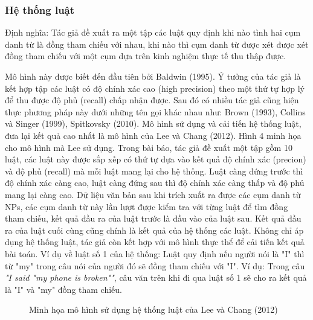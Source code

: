 \documentclass[12pt]{extarticle}
\begin{document}
				\subsubsection*{Hệ thống luật}
					\par Định nghĩa: Tác giả đề xuất ra một tập các luật quy định khi nào tình hai cụm danh từ là đồng tham chiếu với nhau, khi nào thì cụm danh từ được xét được xét đồng tham chiếu với một cụm dựa trên kinh nghiệm thực tế thu thập được.
					\par Mô hình này được biết đến đầu tiên bởi Baldwin (1995)\cite{baldwin95}. Ý tưởng của tác giả là kết hợp tập các luật có độ chính xác cao (high precision) theo một thứ tự hợp lý để thu được độ phủ (recall) chấp nhận được. Sau đó có nhiều tác giả cũng hiện thực phương pháp này dưới những tên gọi khác nhau như: Brown (1993)\cite{brown93}, Collins và Singer (1999)\cite{collin99}, Spitkovsky (2010)\cite{spitkovsky10}. 
					Mô hình sử dụng và cải tiến hệ thống luật, đưa lại kết quả cao nhất là mô hình của Lee và Chang (2012)\cite{lee12}. Hình 4 minh họa cho mô hình mà Lee sử dụng. Trong bài báo, tác giả đề xuất một tập gồm 10 luật, các luật này được sắp xếp có thứ tự dựa vào kết quả độ chính xác (precion) và độ phủ (recall) mà mỗi luật mang lại cho hệ thống. Luật càng đứng trước thì độ chính xác càng cao, luật càng đứng sau thì độ chính xác càng thấp và độ phủ mang lại càng cao. Dữ liệu văn bản sau khi trích xuất ra được các cụm danh từ NPs, các cụm danh từ này lần lượt được kiểm tra với từng luật để tìm đồng tham chiếu, kết quả đầu ra của luật trước là đầu vào của luật sau. Kết quả đầu ra của luật cuối cùng cũng chính là kết quả của hệ thống các luật. Không chỉ áp dụng hệ thống luật, tác giả còn kết hợp với mô hình thực thể để cải tiến kết quả bài toán. Ví dụ về luật số 1 của hệ thống: Luật quy định nếu người nói là "I" thì từ "my" trong câu nói của người đó sẽ đồng tham chiếu với "I". Ví dụ: Trong câu \textit{"I said "my phone is broken""}, câu văn trên khi đi qua luật số 1 sẽ cho ra kết quả là "I" và "my" đồng tham chiếu.
					\begin{figure}
						\centering
						
						\caption{Minh họa mô hình sử dụng hệ thống luật của Lee và Chang (2012)\cite{lee12}}
					\end{figure}				
\end{document}
